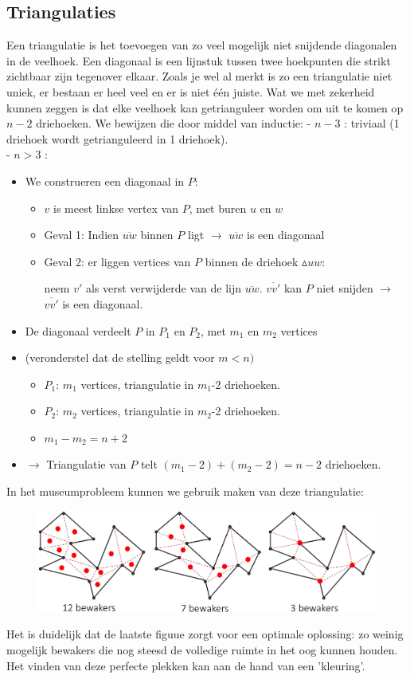 \documentclass[12pt,a4paper]{article}
\begin{document}
	\subsection{Triangulaties}
	Een triangulatie is het toevoegen van zo veel mogelijk niet snijdende diagonalen in de veelhoek. Een diagonaal is een lijnstuk tussen twee hoekpunten die strikt zichtbaar zijn tegenover elkaar. Zoals je wel al merkt is zo een triangulatie niet uniek, er bestaan er heel veel en er is niet één juiste. Wat we met zekerheid kunnen zeggen is dat elke veelhoek kan getrianguleer worden om uit te komen op $n-2$ driehoeken. We bewijzen die door middel van inductie: 
	- $n-3$ : triviaal (1 driehoek wordt getrianguleerd in 1 driehoek).\\
	- $n > 3$ : 
	\begin{itemize}
		\item We construeren een diagonaal in $P$:
		\begin{itemize}
			\item $v$ is meest linkse vertex van $P$, met buren $u$ en $w$
			\item Geval 1: Indien $\overline{uw}$ binnen $P$ ligt $\rightarrow$ $\overline{uw}$ is een diagonaal
			\item Geval 2: er liggen vertices van $P$ binnen de driehoek $\vartriangle uw$:
			
			neem $v'$ als verst verwijderde van de lijn $\overline{uw}$. $\overline{vv'}$ kan $P$ niet snijden $\rightarrow$ $\overline{vv'}$ is een diagonaal. 
		\end{itemize}
		\item De diagonaal verdeelt $P$ in $P_1$ en $P_2$, met $m_1$ en $m_2$ vertices
		\item (veronderstel dat de stelling geldt voor $m<n)$
		\begin{itemize}
			\item $P_1$: $m_1$ vertices, triangulatie in $m_1$-2 driehoeken. 
			\item $P_2$: $m_2$ vertices, triangulatie in $m_2$-2 driehoeken. 
			\item $m_1 - m_2 = n+2$
		\end{itemize}
		\item $\rightarrow$ Triangulatie van $P$ telt $(m_1 -2) + (m_2 - 2) = n-2$ driehoeken. 
	\end{itemize}
	In het museumprobleem kunnen we gebruik maken van deze triangulatie: 
	\begin{figure}[H]
		\centering
		\includegraphics[width=0.9\linewidth]{afbeeldingen/triangulatie-bewakers}
		\label{fig:triangulatie-bewakers}
	\end{figure}
	Het is duidelijk dat de laatste figuue zorgt voor een optimale oplossing: zo weinig mogelijk bewakers die nog steesd de volledige ruimte in het oog kunnen houden. Het vinden van deze perfecte plekken kan aan de hand van een 'kleuring'. 
	
\end{document}
